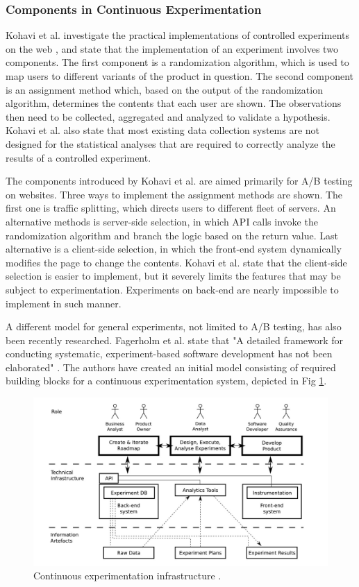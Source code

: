 \documentclass[english, grading]{tktltiki2}
\theoremstyle{definition}
\theoremstyle{remark}
\begin{document}
\subsubsection{Components in Continuous Experimentation}
Kohavi et al. investigate the practical implementations of controlled experiments on the web \cite{kohavi2007practical}, and state that the implementation of an experiment involves two components. The first component is a randomization algorithm, which is used to map users to different variants of the product in question. The second component is an assignment method which, based on the output of the randomization algorithm, determines the contents that each user are shown. The observations then need to be collected, aggregated and analyzed to validate a hypothesis. Kohavi et al. also state that most existing data collection systems are not designed for the statistical analyses that are required to correctly analyze the results of a controlled experiment.

The components introduced by Kohavi et al. are aimed primarily for A/B testing on websites. Three ways to implement the assignment methods are shown. The first one is traffic splitting, which directs users to different fleet of servers. An alternative methods is server-side selection, in which API calls invoke the randomization algorithm and branch the logic based on the return value. Last alternative is a client-side selection, in which the front-end system dynamically modifies the page to change the contents. Kohavi et al. state that the client-side selection is easier to implement, but it severely limits the features that may be subject to experimentation. Experiments on back-end are nearly impossible to implement in such manner.

A different model for general experiments, not limited to A/B testing, has also been recently researched. Fagerholm et al. state that "A detailed framework for conducting systematic, experiment-based software development has not been elaborated" \cite{fagerholm2014building}. The authors have created an initial model consisting of required building blocks for a continuous experimentation system, depicted in Fig \ref{fig5}. 

\begin{figure}[h]
	\centering
	\includegraphics[width=5.0in]{infra.jpg}
	\caption{Continuous experimentation infrastructure \cite{fagerholm2014building}.}
	\label{fig5}
\end{figure}
\end{document}
